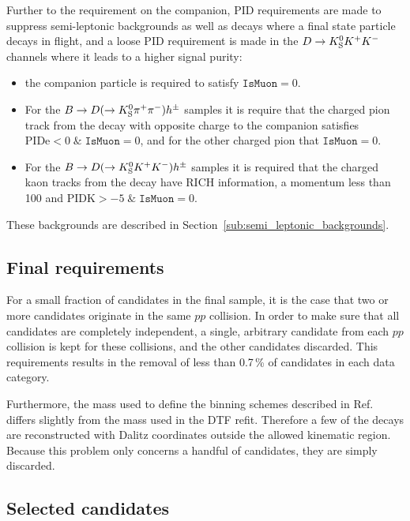 Further to the requirement on the companion, PID requirements are made to suppress semi-leptonic backgrounds as well as decays where a final state particle decays in flight, and a loose PID requirement is made in the ${D}\rightarrow{\ensuremath{{K}^0_{\mathrm{S}}}}{\ensuremath{{K}^+}}{\ensuremath{{K}^-}}$ channels where it leads to a higher signal purity:
\begin{itemize}
    \item the companion particle is required to satisfy $\texttt{IsMuon}=0$.
    \item For the ${B}\rightarrow{\ensuremath{D}}(\rightarrow{\ensuremath{{K}^0_{\mathrm{S}}}}{\ensuremath{{\pi}^+}}{\ensuremath{{\pi}^-}})h^{\pm}$ samples it is require that the charged pion track from the \D decay with opposite charge to the companion satisfies ${\textrm{PIDe} < 0 \;\&\; \texttt{IsMuon}=0}$, and for the other charged pion that ${\texttt{IsMuon}=0}$.
    \item For the ${B}\rightarrow{\ensuremath{D}}(\rightarrow{\ensuremath{{K}^0_{\mathrm{S}}}}{\ensuremath{{K}^+}}{\ensuremath{{K}^-}})h^{\pm}$ samples it is required that the charged kaon tracks from the \D decay have RICH information, a momentum less than 100 \gevc and ${\textrm{PIDK} > -5 \;\&\; \texttt{IsMuon}=0}$.
\end{itemize}
These backgrounds are described in Section~\ref{sub:semi_leptonic_backgrounds}.



\subsection{Final requirements} %
\label{sub:final_requirements}

For a small fraction of candidates in the final sample, it is the case that two or more candidates originate in the same $pp$ collision. In order to make sure that all candidates are completely independent, a single, arbitrary candidate from each $pp$ collision is kept for these collisions, and the other candidates discarded. This requirements results in the removal of less than 0.7\,\% of candidates in each data category.

Furthermore, the \D mass used to define the binning schemes described in Ref.~\cite{CLEOCISI} differs slightly from the mass used in the DTF refit. Therefore a few of the decays are reconstructed with Dalitz coordinates outside the allowed kinematic region. Because this problem only concerns a handful of candidates, they are simply discarded.


\subsection{Selected candidates} %
\label{sub:selected_candidates}

